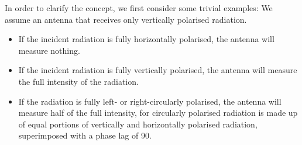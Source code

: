 In order to clarify the concept, we first consider some trivial examples:
We assume an antenna that receives only vertically polarised
radiation.
\begin{itemize}
\item If the incident radiation is fully horizontally polarised, the
  antenna will measure nothing.
\item If the incident radiation is fully vertically polarised, the
  antenna will measure the full intensity of the radiation.
\item If the radiation is fully left- or right-circularly polarised,
  the antenna will measure half of the full intensity, for circularly
  polarised radiation is made up of equal portions of vertically and
  horizontally polarised radiation, superimposed with a phase lag of
  90\degree.
\end{itemize}

